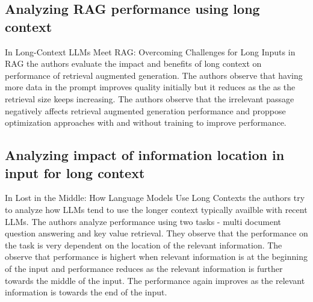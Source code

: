 \documentclass{article}
\begin{document}
\subsection{Analyzing RAG performance using long context}
In Long-Context LLMs Meet RAG: Overcoming Challenges for Long Inputs in RAG \cite{jin2024longcontextllmsmeetrag} the authors evaluate the impact and benefits of long context on performance of retrieval augmented generation.  The authors observe that having more data in the prompt improves quality initially but it reduces as the as the retrieval size keeps increasing. The authors observe that the irrelevant passage negatively affects retrieval augmented generation performance and proppose optimization approaches with and without training to improve performance.
\subsection{Analyzing impact of information location in input for long context}
In Lost in the Middle: How Language Models Use Long Contexts \cite{liu2023lostmiddlelanguagemodels} the authors try to analyze how LLMs tend to use the longer context typically availble with recent LLMs. The authors analyze performance using two tasks - multi document question answering and key value retrieval. They observe that the performance on the task is very dependent on the location of the relevant information. The observe that performance is highert when relevant information is at the beginning of the input and performance reduces as the relevant information is further towards the middle of the input. The performance again improves as the relevant information is towards the end of the input.

\end{document}
